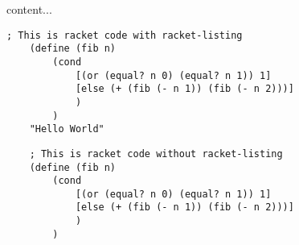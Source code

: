 \documentclass{article}
\begin{document}
	content...
	\begin{lstlisting}[language=racket]
	; This is racket code with racket-listing
	(define (fib n)
		(cond
			[(or (equal? n 0) (equal? n 1)) 1]
			[else (+ (fib (- n 1)) (fib (- n 2)))]
			)
		)
	"Hello World"
	\end{lstlisting}

	\begin{lstlisting}
	; This is racket code without racket-listing
	(define (fib n)
		(cond
			[(or (equal? n 0) (equal? n 1)) 1]
			[else (+ (fib (- n 1)) (fib (- n 2)))]
			)
		)
	\end{lstlisting}
\end{document}
